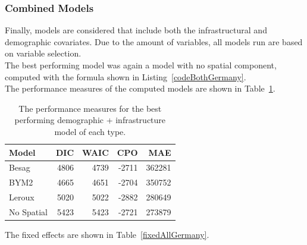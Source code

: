 \subsubsection{Combined Models}
Finally, models are considered that include both the infrastructural and demographic covariates. Due to the amount of variables, all models run are based on variable selection. \\
The best performing model was again a model with no spatial component, computed with the formula shown in Listing~\ref{codeBothGermany}. \\
The performance measures of the computed models are shown in Table~\ref{allGermany}.
\begin{table}[H] 
\caption{The performance measures for the best performing demographic + infrastructure model of each type. \label{allGermany}}
\begin{tabular}{l r r r r}
\toprule
\textbf{Model}	& \textbf{DIC}	& \textbf{WAIC} & \textbf{CPO} & \textbf{MAE}\\
\midrule
Besag&  4806 & 4739 & -2711 & 362281\\
BYM2 & 4665 & 4651 & -2704 & 350752\\
Leroux & 5020 & 5022 & -2882 & 280649 \\
No Spatial & 5423 & 5423 & -2721 & 273879 \\
\bottomrule
\end{tabular}
\end{table}
The fixed effects are shown in Table~\ref{fixedAllGermany}.

